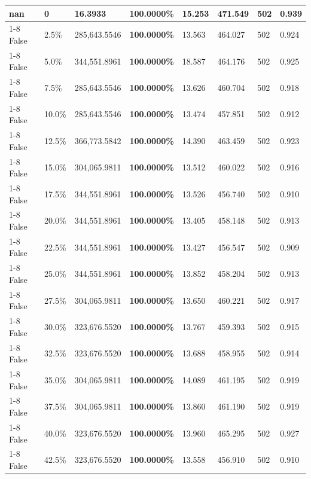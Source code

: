 \begin{table}[H]
{\begin{tabular}{lllrllll}
\midrule
nan & 0 & \bfseries 16.3933 & \bfseries 100.0000\% & 15.253 & 471.549 & 502 & 0.939 \\
\cline{1-8}
False & 2.5\% & 285,643.5546 & \bfseries \color{red} 100.0000\% & 13.563 & 464.027 & 502 & 0.924 \\
\cline{1-8}
False & 5.0\% & 344,551.8961 & \bfseries \color{red} 100.0000\% & 18.587 & 464.176 & 502 & 0.925 \\
\cline{1-8}
False & 7.5\% & 285,643.5546 & \bfseries \color{red} 100.0000\% & 13.626 & 460.704 & 502 & 0.918 \\
\cline{1-8}
False & 10.0\% & 285,643.5546 & \bfseries \color{red} 100.0000\% & 13.474 & 457.851 & 502 & 0.912 \\
\cline{1-8}
False & 12.5\% & 366,773.5842 & \bfseries \color{red} 100.0000\% & 14.390 & 463.459 & 502 & 0.923 \\
\cline{1-8}
False & 15.0\% & 304,065.9811 & \bfseries \color{red} 100.0000\% & 13.512 & 460.022 & 502 & 0.916 \\
\cline{1-8}
False & 17.5\% & 344,551.8961 & \bfseries \color{red} 100.0000\% & 13.526 & 456.740 & 502 & 0.910 \\
\cline{1-8}
False & 20.0\% & 344,551.8961 & \bfseries \color{red} 100.0000\% & 13.405 & 458.148 & 502 & 0.913 \\
\cline{1-8}
False & 22.5\% & 344,551.8961 & \bfseries \color{red} 100.0000\% & 13.427 & 456.547 & 502 & 0.909 \\
\cline{1-8}
False & 25.0\% & 344,551.8961 & \bfseries \color{red} 100.0000\% & 13.852 & 458.204 & 502 & 0.913 \\
\cline{1-8}
False & 27.5\% & 304,065.9811 & \bfseries \color{red} 100.0000\% & 13.650 & 460.221 & 502 & 0.917 \\
\cline{1-8}
False & 30.0\% & 323,676.5520 & \bfseries \color{red} 100.0000\% & 13.767 & 459.393 & 502 & 0.915 \\
\cline{1-8}
False & 32.5\% & 323,676.5520 & \bfseries \color{red} 100.0000\% & 13.688 & 458.955 & 502 & 0.914 \\
\cline{1-8}
False & 35.0\% & 304,065.9811 & \bfseries \color{red} 100.0000\% & 14.089 & 461.195 & 502 & 0.919 \\
\cline{1-8}
False & 37.5\% & 304,065.9811 & \bfseries \color{red} 100.0000\% & 13.860 & 461.190 & 502 & 0.919 \\
\cline{1-8}
False & 40.0\% & 323,676.5520 & \bfseries \color{red} 100.0000\% & 13.960 & 465.295 & 502 & 0.927 \\
\cline{1-8}
False & 42.5\% & 323,676.5520 & \bfseries \color{red} 100.0000\% & 13.558 & 456.910 & 502 & 0.910 \\

\end{tabular}}
\end{table}
